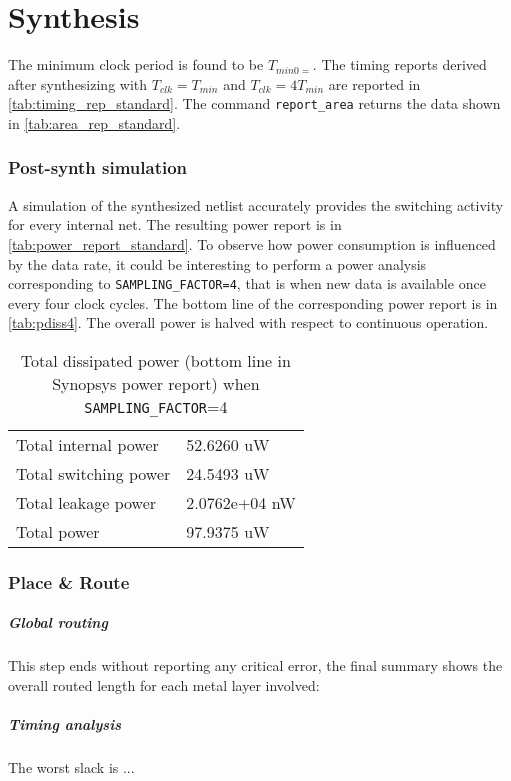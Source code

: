 \chapter{Synthesis}
The minimum clock period is found to be $T_{min0=}$. The timing reports derived after synthesizing with $T_{clk}=T_{min}$ and $T_{clk}=4T_{min}$ are reported in \autoref{tab:timing_rep_standard}.
The command \texttt{report\_area} returns the data shown in \autoref{tab:area_rep_standard}.
\subsection{Post-synth simulation}
A simulation of the synthesized netlist accurately provides the switching activity for every internal net. The resulting power report is in \autoref{tab:power_report_standard}. To observe how power consumption is influenced by the data rate, it could be interesting to perform a power analysis corresponding to \texttt{SAMPLING\_FACTOR=4}, that is when new data is available once every four clock cycles. The bottom line of the corresponding power report is in \autoref{tab:pdiss4}. The overall power is halved with respect to continuous operation.
\begin{table}
\begin{tabular}{|l|l|}
\hline
Total internal power          &   52.6260 uW  \\
Total switching power &      24.5493 uW \\
Total leakage power &    2.0762e+04 nW    \\
Total power &    97.9375 uW\\\hline
\end{tabular}
\caption{Total dissipated power (bottom line in Synopsys power report) when \texttt{SAMPLING\_FACTOR}=4}
\label{tab:pdiss4}
\end{table}

\subsection{Place \& Route}
\paragraph{Global routing} This step ends without reporting any critical error, the final summary shows the overall routed length for each metal layer involved:


\paragraph{Timing analysis} The worst slack is ...


